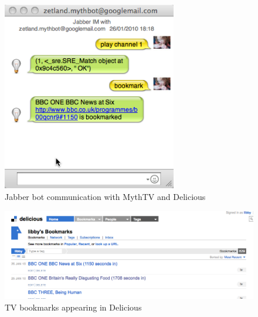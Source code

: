 \documentclass[]{article}%
\begin{document}
\begin{figure}[htbp]
\begin{center}
\includegraphics[width=3in]{bot.png}
\caption{Jabber bot communication with MythTV and Delicious} \label{fig:bot}
\end{center}
\end{figure}

\begin{figure}[htbp]
\begin{center}
\includegraphics[width=6in]{bookmarks.png}
\caption{TV bookmarks appearing in Delicious} \label{fig:bookmarks}
\end{center}
\end{figure}
\end{document}
